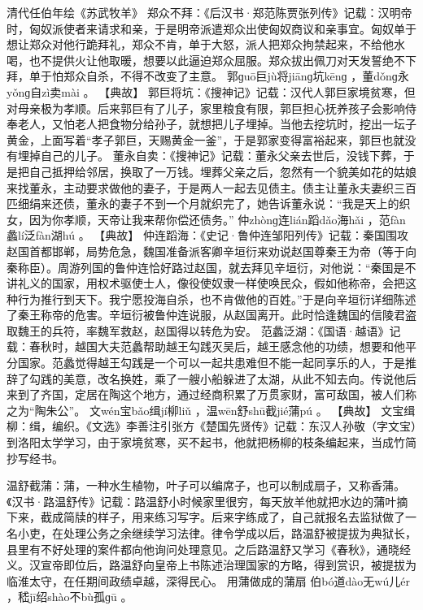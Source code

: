 \documentclass[12pt,UTF8]{ctexbook}
\begin{document}
清代任伯年绘《苏武牧羊》
郑众不拜：《后汉书·郑范陈贾张列传》记载：汉明帝时，匈奴派使者来请求和亲，于是明帝派遣郑众出使匈奴商议和亲事宜。匈奴单于想让郑众对他行跪拜礼，郑众不肯，单于大怒，派人把郑众拘禁起来，不给他水喝，也不提供火让他取暖，想要以此逼迫郑众屈服。郑众拔出佩刀对天发誓绝不下拜，单于怕郑众自杀，不得不改变了主意。
郭ɡuō巨jù将jiānɡ坑kēnɡ
，董dǒnɡ永yǒnɡ自zì卖mài
。
【典故】
郭巨将坑：《搜神记》记载：汉代人郭巨家境贫寒，但对母亲极为孝顺。后来郭巨有了儿子，家里粮食有限，郭巨担心抚养孩子会影响侍奉老人，又怕老人把食物分给孙子，就想把儿子埋掉。当他去挖坑时，挖出一坛子黄金，上面写着“孝子郭巨，天赐黄金一釜”，于是郭家变得富裕起来，郭巨也就没有埋掉自己的儿子。
董永自卖：《搜神记》记载：董永父亲去世后，没钱下葬，于是把自己抵押给邻居，换取了一万钱。埋葬父亲之后，忽然有一个貌美如花的姑娘来找董永，主动要求做他的妻子，于是两人一起去见债主。债主让董永夫妻织三百匹细绢来还债，董永的妻子不到一个月就织完了，她告诉董永说：“我是天上的织女，因为你孝顺，天帝让我来帮你偿还债务。”
仲zhònɡ连lián蹈dǎo海hǎi
，范fàn蠡lí泛fàn湖hú
。
【典故】
仲连蹈海：《史记·鲁仲连邹阳列传》记载：秦国围攻赵国首都邯郸，局势危急，魏国准备派客卿辛垣衍来劝说赵国尊秦王为帝（等于向秦称臣）。周游列国的鲁仲连恰好路过赵国，就去拜见辛垣衍，对他说：“秦国是不讲礼义的国家，用权术驱使士人，像役使奴隶一样使唤民众，假如他称帝，会把这种行为推行到天下。我宁愿投海自杀，也不肯做他的百姓。”于是向辛垣衍详细陈述了秦王称帝的危害。辛垣衍被鲁仲连说服，从赵国离开。此时恰逢魏国的信陵君盗取魏王的兵符，率魏军救赵，赵国得以转危为安。
范蠡泛湖：《国语·越语》记载：春秋时，越国大夫范蠡帮助越王勾践灭吴后，越王感念他的功绩，想要和他平分国家。范蠡觉得越王勾践是一个可以一起共患难但不能一起同享乐的人，于是推辞了勾践的美意，改名换姓，乘了一艘小船躲进了太湖，从此不知去向。传说他后来到了齐国，定居在陶这个地方，通过经商积累了万贯家财，富可敌国，被人们称之为“陶朱公”。
文wén宝bǎo缉jí柳liǔ
，温wēn舒shū截jié蒲pú
。
【典故】
文宝缉柳：缉，编织。《文选》李善注引张方《楚国先贤传》记载：东汉人孙敬（字文宝）到洛阳太学学习，由于家境贫寒，买不起书，他就把杨柳的枝条编起来，当成竹简抄写经书。

温舒截蒲：蒲，一种水生植物，叶子可以编席子，也可以制成扇子，又称香蒲。《汉书·路温舒传》记载：路温舒小时候家里很穷，每天放羊他就把水边的蒲叶摘下来，截成简牍的样子，用来练习写字。后来字练成了，自己就报名去监狱做了一名小吏，在处理公务之余继续学习法律。律令学成以后，路温舒被提拔为典狱长，县里有不好处理的案件都向他询问处理意见。之后路温舒又学习《春秋》，通晓经义。汉宣帝即位后，路温舒向皇帝上书陈述治理国家的方略，得到赏识，被提拔为临淮太守，在任期间政绩卓越，深得民心。
用蒲做成的蒲扇
伯bó道dào无wú儿ér
，嵇jī绍shào不bù孤ɡū
。
\end{document}
